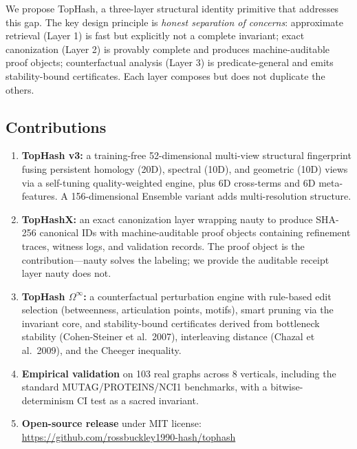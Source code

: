 \documentclass[11pt]{article}
\begin{document}
We propose TopHash, a three-layer structural identity primitive that addresses this gap. The key design principle is \emph{honest separation of concerns}: approximate retrieval (Layer 1) is fast but explicitly not a complete invariant; exact canonization (Layer 2) is provably complete and produces machine-auditable proof objects; counterfactual analysis (Layer 3) is predicate-general and emits stability-bound certificates. Each layer composes but does not duplicate the others.

\subsection{Contributions}

\begin{enumerate}
    \item \textbf{TopHash v3:} a training-free 52-dimensional multi-view structural fingerprint fusing persistent homology (20D), spectral (10D), and geometric (10D) views via a self-tuning quality-weighted engine, plus 6D cross-terms and 6D meta-features. A 156-dimensional Ensemble variant adds multi-resolution structure.
    
    \item \textbf{TopHashX:} an exact canonization layer wrapping nauty to produce SHA-256 canonical IDs with machine-auditable proof objects containing refinement traces, witness logs, and validation records. The proof object is the contribution---nauty solves the labeling; we provide the auditable receipt layer nauty does not.
    
    \item \textbf{TopHash $\Omega^\infty$:} a counterfactual perturbation engine with rule-based edit selection (betweenness, articulation points, motifs), smart pruning via the invariant core, and stability-bound certificates derived from bottleneck stability (Cohen-Steiner et al.\ 2007), interleaving distance (Chazal et al.\ 2009), and the Cheeger inequality.
    
    \item \textbf{Empirical validation} on 103 real graphs across 8 verticals, including the standard MUTAG/PROTEINS/NCI1 benchmarks, with a bitwise-determinism CI test as a sacred invariant.
    
    \item \textbf{Open-source release} under MIT license: \url{https://github.com/rossbuckley1990-hash/tophash}
\end{enumerate}
\end{document}
